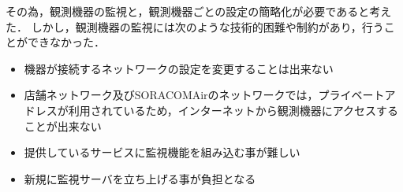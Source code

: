その為，観測機器の監視と，観測機器ごとの設定の簡略化が必要であると考えた．
しかし，観測機器の監視には次のような技術的困難や制約があり，行うことができなかった．
\begin{itemize}
\item 機器が接続するネットワークの設定を変更することは出来ない
\item 店舗ネットワーク及びSORACOMAirのネットワークでは，プライベートアドレスが利用されているため，インターネットから観測機器にアクセスすることが出来ない
\item 提供しているサービスに監視機能を組み込む事が難しい
\item 新規に監視サーバを立ち上げる事が負担となる
\end{itemize}

